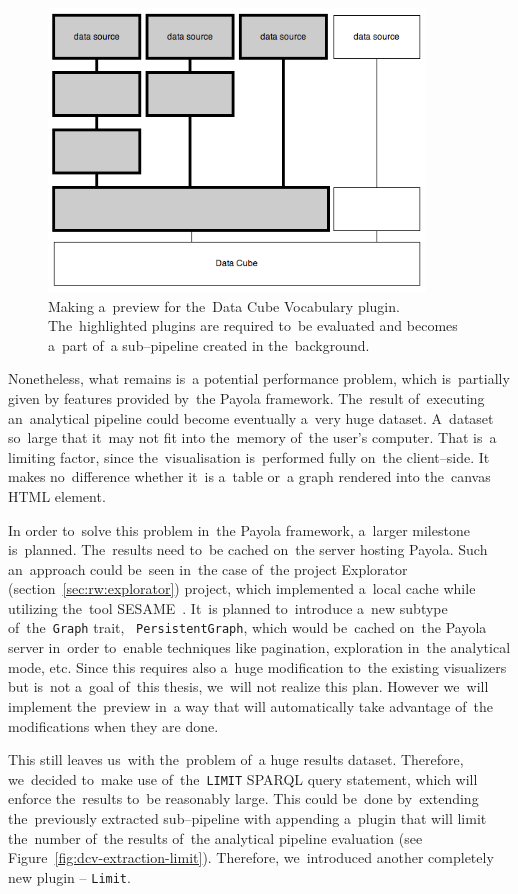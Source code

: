 \begin{figure}
	\centering
	\includegraphics[width=100mm]{img/dcv-extraction.png}
	\caption{Making a~preview for the~Data Cube Vocabulary plugin. The~highlighted
	plugins are required to~be evaluated and becomes a~part of~a sub--pipeline created
	in the~background.}
	\label{fig:dcv-extraction}
\end{figure}

Nonetheless, what remains is~a potential performance problem, which is~partially given 
by features provided by~the Payola framework. The~result of~executing an~analytical pipeline could become eventually a~very huge dataset. A~dataset so~large that it~may not fit into the~memory of~the user's computer. That is~a 
limiting factor, since the~visualisation is~performed fully on~the client--side. 
It makes no~difference whether it~is a~table or~a graph rendered into the~canvas HTML element.

In order to~solve this problem in~the Payola framework, a~larger milestone is~planned. The~results need to~be cached on~the server hosting Payola.
Such an~approach could be~seen in~the case of~the project 
Explorator (section~\ref{sec:rw:explorator}) project, which implemented a~local cache
while utilizing the~tool SESAME~\cite{sesame}. It~is planned to~introduce a~new 
subtype of~the~\texttt{Graph} trait, ~\texttt{PersistentGraph}, which would be~cached on~the Payola server in~order to~enable techniques like pagination, 
exploration in~the analytical mode, etc. Since this requires also a~huge 
modification to~the existing visualizers but is~not a~goal of~this thesis, we~will 
not realize this plan. However we~will implement the~preview in~a way that will 
automatically take advantage of~the modifications when they are done.

This still leaves us~with the~problem of~a huge results dataset. Therefore, we~decided to~make use of~the~\texttt{LIMIT} SPARQL query statement, which will 
enforce the~results to~be reasonably large. This could be~done by~extending the~previously extracted sub--pipeline with appending a~plugin that 
will limit the~number of~the results of~the analytical
pipeline evaluation (see Figure~\ref{fig:dcv-extraction-limit}). Therefore, we~introduced another completely new plugin -- \texttt{Limit}.


